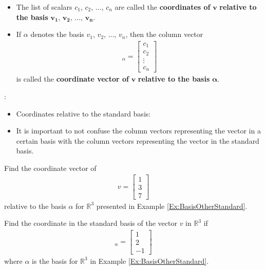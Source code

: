 \documentclass[12pt,a4paper]{article}
\newcounter{example}[section]
\begin{document}
	\vspace*{14pt}
	
	\begin{itemize}
	\item The list of scalars $c_1$, $c_2$, $\ldots$, $c_n$ are called the \textbf{coordinates of} $\mathbf{v}$ \textbf{relative to the basis} $\mathbf{v_1, \, v_2 , \, \ldots , \, v_n}$. 
	
	\item If $\alpha$ denotes the basis $v_1$, $v_2$, $\ldots$, $v_n$, then the column vector
		\begin{align*}
		[v]_{\alpha} = \begin{bmatrix}
		c_1 \\ c_2 \\ \vdots \\ c_n
		\end{bmatrix}
		\end{align*}
	is called the \textbf{coordinate vector of} $\mathbf{v}$ \textbf{relative to the basis} $\mathbf{\alpha}$.
	\end{itemize}
	
	\vspace*{18pt}
	
	:
		\begin{itemize}
		\item Coordinates relative to the standard basis:
			\vfill
		\item It is important to not confuse the column vectors representing the vector in a certain basis with the column vectors representing the vector in the standard basis.
		\end{itemize}
	
	\newpage
	
	\begin{example}
	Find the coordinate vector of
		\begin{align*}
		v = \begin{bmatrix}
		1 \\ 3 \\ 7
		\end{bmatrix}
		\end{align*}
	relative to the basis $\alpha$ for $\mathbb{R}^3$ presented in Example \ref{Ex:BasisOtherStandard}.
	\end{example}
	
	\newpage
	
	\begin{example}
	Find the coordinate in the standard basis of the vector $v$ in $\mathbb{R}^3$ if
		\begin{align*}
		[v]_{\alpha} = \begin{bmatrix}
		1 \\ 2 \\ -1
		\end{bmatrix}
		\end{align*}
	where $\alpha$ is the basis for $\mathbb{R}^3$ in Example \ref{Ex:BasisOtherStandard}.
	\end{example}
	
\end{document}
